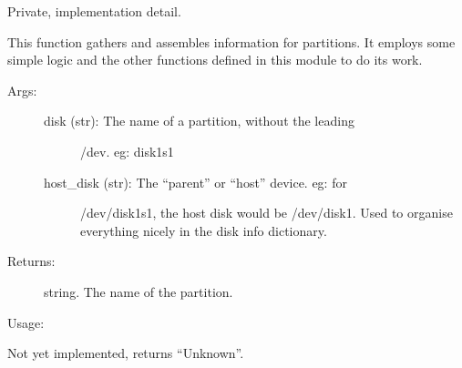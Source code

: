 \documentclass[letterpaper,10pt,english]{sphinxmanual}
\begin{document}
\begin{fulllineitems}
\label{\detokenize{macos:getdevinfo.macos.get_partition_info}}
Private, implementation detail.

This function gathers and assembles information for partitions.
It employs some simple logic and the other functions defined in this
module to do its work.
\begin{description}
\item[{Args:}] \leavevmode\begin{description}
\item[{disk (str):         The name of a partition, without the leading}] \leavevmode
/dev. eg: disk1s1

\item[{host\_disk (str):    The “parent” or “host” device. eg: for}] \leavevmode
/dev/disk1s1, the host disk would be /dev/disk1.
Used to organise everything nicely in the
disk info dictionary.

\end{description}

\item[{Returns:}] \leavevmode
string.     The name of the partition.

\end{description}

Usage:

\begin{sphinxVerbatim}[commandchars=\\\{\}]
   
\end{sphinxVerbatim}

\end{fulllineitems}


\begin{fulllineitems}
\label{\detokenize{macos:getdevinfo.macos.get_partitioning}}
Not yet implemented, returns “Unknown”.

\end{fulllineitems}
\end{document}
